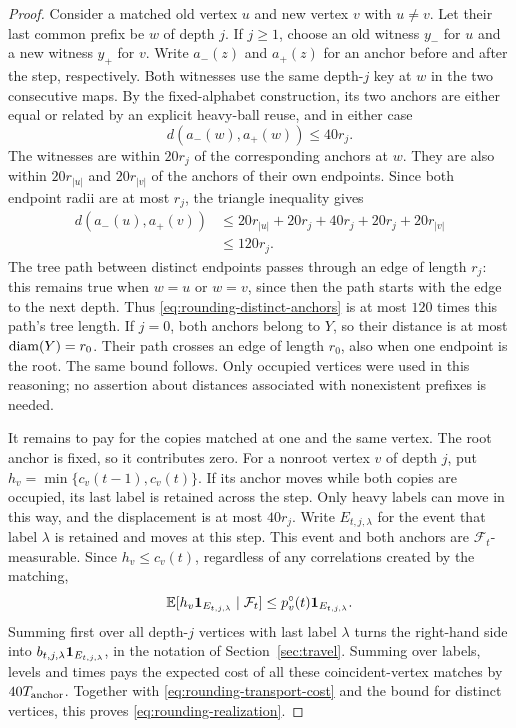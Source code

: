 \begin{proof}
Consider a matched old vertex $u$ and new vertex $v$ with $u\ne v$.
Let their last common prefix be $w$ of depth $j$.  If $j\ge1$, choose an
old witness $y_-$ for $u$ and a new witness $y_+$ for $v$.  Write $a_-(z)$
and $a_+(z)$ for an anchor before and after the step, respectively.
Both witnesses use the same depth-$j$ key at $w$ in the two consecutive
maps.  By the fixed-alphabet construction, its two anchors are either equal
or related by an explicit heavy-ball reuse, and in either case
\[
 d(a_-(w),a_+(w))\le40r_j.
\]
The witnesses are within $20r_j$ of the corresponding anchors at $w$.
They are also within $20r_{|u|}$ and $20r_{|v|}$ of the anchors of their own
endpoints.  Since both endpoint radii are at most $r_j$, the triangle
inequality gives
\begin{equation}\label{eq:rounding-distinct-anchors}
 \begin{aligned}
 d(a_-(u),a_+(v))
 &\le20r_{|u|}+20r_j+40r_j+20r_j+20r_{|v|}\\
 &\le120r_j.
 \end{aligned}
\end{equation}
The tree path between distinct endpoints passes through an edge of length
$r_j$: this remains true when $w=u$ or $w=v$, since then the path starts
with the edge to the next depth.  Thus \eqref{eq:rounding-distinct-anchors}
is at most $120$ times this path's tree length.  If $j=0$, both anchors
belong to $Y$, so their distance is at most $\operatorname{diam}(Y)=r_0$.  Their path
crosses an edge of length $r_0$, also when one endpoint is the root.  The
same bound follows.  Only occupied vertices were used in this reasoning;
no assertion about distances associated with nonexistent prefixes is needed.

It remains to pay for the copies matched at one and the same vertex.
The root anchor is fixed, so it contributes zero.  For a nonroot vertex
$v$ of depth $j$, put
$h_v=\min\{c_v(t-1),c_v(t)\}$.  If its anchor moves while both copies
are occupied, its last label is retained across the step.  Only heavy
labels can move in this way, and the displacement is at most $40r_j$.
Write $E_{t,j,\lambda}$ for the event that label $\lambda$ is retained and
moves at this step.  This event and both anchors are
$\mathcal F_t$-measurable.  Since $h_v\le c_v(t)$, regardless of any
correlations created by the matching,
\[
 \mathbb E[h_v\mathbf 1_{E_{t,j,\lambda}}\mid\mathcal F_t]
       \le p_v^\circ(t)\mathbf 1_{E_{t,j,\lambda}}.
\]
Summing first over all depth-$j$ vertices with last label $\lambda$ turns
the right-hand side into
$b_{t,j,\lambda}\mathbf 1_{E_{t,j,\lambda}}$, in the notation of
Section~\ref{sec:travel}.  Summing over labels, levels and times pays the
expected cost of all these coincident-vertex matches by $40T_{\rm anchor}$.
Together with \eqref{eq:rounding-transport-cost} and the bound for distinct
vertices, this proves \eqref{eq:rounding-realization}.


\end{proof}
